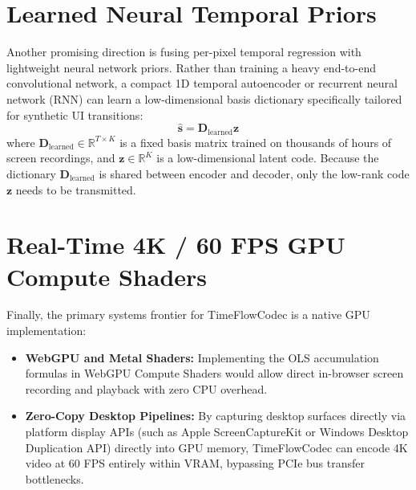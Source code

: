 \section{Learned Neural Temporal Priors}
Another promising direction is fusing per-pixel temporal regression with lightweight neural network priors. Rather than training a heavy end-to-end convolutional network, a compact 1D temporal autoencoder or recurrent neural network (RNN) can learn a low-dimensional basis dictionary specifically tailored for synthetic UI transitions:
\begin{equation}
    \hat{\mathbf{s}} = \mathbf{D}_{\text{learned}} \mathbf{z}
\end{equation}
where $\mathbf{D}_{\text{learned}} \in \mathbb{R}^{T \times K}$ is a fixed basis matrix trained on thousands of hours of screen recordings, and $\mathbf{z} \in \mathbb{R}^K$ is a low-dimensional latent code. Because the dictionary $\mathbf{D}_{\text{learned}}$ is shared between encoder and decoder, only the low-rank code $\mathbf{z}$ needs to be transmitted.

\section{Real-Time 4K / 60 FPS GPU Compute Shaders}
Finally, the primary systems frontier for TimeFlowCodec is a native GPU implementation:
\begin{itemize}
    \item \textbf{WebGPU and Metal Shaders:} Implementing the OLS accumulation formulas in WebGPU Compute Shaders would allow direct in-browser screen recording and playback with zero CPU overhead.
    \item \textbf{Zero-Copy Desktop Pipelines:} By capturing desktop surfaces directly via platform display APIs (such as Apple ScreenCaptureKit or Windows Desktop Duplication API) directly into GPU memory, TimeFlowCodec can encode 4K video at 60 FPS entirely within VRAM, bypassing PCIe bus transfer bottlenecks.
\end{itemize}
